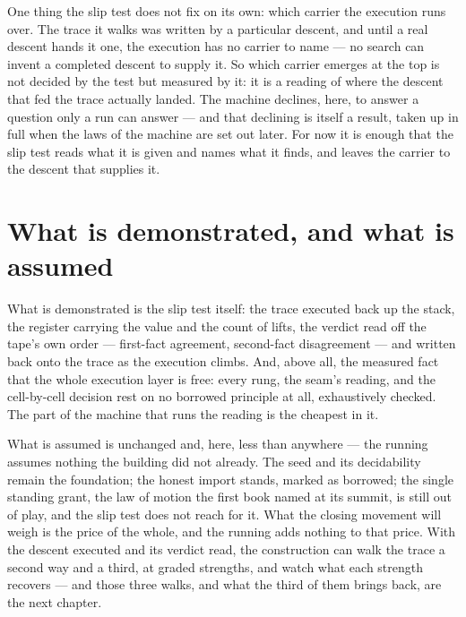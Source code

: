 One thing the slip test does not fix on its own: which carrier the execution runs over. The trace it walks
was written by a particular descent, and until a real descent hands it one, the execution has no carrier to
name --- no search can invent a completed descent to supply it. So which carrier emerges at the top is not
decided by the test but measured by it: it is a reading of where the descent that fed the trace actually
landed. The machine declines, here, to answer a question only a run can answer --- and that declining is
itself a result, taken up in full when the laws of the machine are set out later. For now it is enough that
the slip test reads what it is given and names what it finds, and leaves the carrier to the descent that
supplies it.

\section{What is demonstrated, and what is assumed}
\label{se:demonstrated-assumed-III4}

What is demonstrated is the slip test itself: the trace executed back up the stack, the register carrying
the value and the count of lifts, the verdict read off the tape's own order --- first-fact agreement,
second-fact disagreement --- and written back onto the trace as the execution climbs. And, above all, the
measured fact that the whole execution layer is free: every rung, the seam's reading, and the cell-by-cell
decision rest on no borrowed principle at all, exhaustively checked. The part of the machine that runs the
reading is the cheapest in it.

What is assumed is unchanged and, here, less than anywhere --- the running assumes nothing the building did
not already. The seed and its decidability remain the foundation; the honest import stands, marked as
borrowed; the single standing grant, the law of motion the first book named at its summit, is still out of
play, and the slip test does not reach for it. What the closing movement will weigh is the price of the
whole, and the running adds nothing to that price. With the descent executed and its verdict read, the
construction can walk the trace a second way and a third, at graded strengths, and watch what each strength
recovers --- and those three walks, and what the third of them brings back, are the next chapter.
